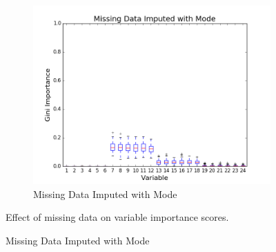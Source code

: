 \begin{figure}[H]
\begin{subfigure}[b]{0.45\textwidth}
    \includegraphics[width=\textwidth]{figures/random_forests/rf_missing_data_imputed_mode}
    \caption{Missing Data Imputed with Mode}
    \label{fig:missing-data-imputed}
  \end{subfigure}
  
  Effect of missing data on variable importance scores.
  \label{fig:missing-data}
\end{figure}

